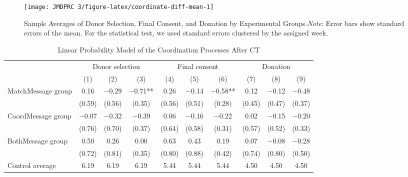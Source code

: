 \documentclass[12pt, a4paper]{article}
\begin{document}
\begin{table}[H]
\begin{threeparttable}
\begin{tablenotes}
\end{tablenotes}
\end{threeparttable}
\end{table}

\begin{figure}[H]
\texttt{[image: JMDPRC~3/figure-latex/coordinate-diff-mean-1]} \caption{Sample Averages of Donor Selection, Final Consent, and Donation by Experimental Groups.\newline \emph{Note}: Error bars show standard errors of the mean. For the statistical test, we used standard errors clustered by the assigned week.}\label{fig:coordinate-diff-mean}
\end{figure}

\begin{table}[H]

\caption{\label{tab:lm-coordinate}Linear Probability Model of the Coordination Processes After CT}
\centering
\fontsize{8}{10}\selectfont
\begin{threeparttable}
\begin{tabular}[t]{lccccccccc}
\toprule
\multicolumn{1}{c}{ } & \multicolumn{3}{c}{Donor selection} & \multicolumn{3}{c}{Final consent} & \multicolumn{3}{c}{Donation} \\
\cmidrule(l{3pt}r{3pt}){2-4} \cmidrule(l{3pt}r{3pt}){5-7} \cmidrule(l{3pt}r{3pt}){8-10}
  & (1) & (2) & (3) & (4) & (5) & (6) & (7) & (8) & (9)\\
\midrule
MatchMessage group & \num{0.16} & \num{-0.29} & \num{-0.71}** & \num{0.26} & \num{-0.14} & \num{-0.58}** & \num{0.12} & \num{-0.12} & \num{-0.48}\\
 & (\num{0.59}) & (\num{0.56}) & (\num{0.35}) & (\num{0.56}) & (\num{0.51}) & (\num{0.28}) & (\num{0.45}) & (\num{0.47}) & (\num{0.37})\\
CoordMessage group & \num{-0.07} & \num{-0.32} & \num{-0.39} & \num{0.06} & \num{-0.16} & \num{-0.22} & \num{0.02} & \num{-0.15} & \num{-0.20}\\
 & (\num{0.76}) & (\num{0.70}) & (\num{0.37}) & (\num{0.64}) & (\num{0.58}) & (\num{0.31}) & (\num{0.57}) & (\num{0.52}) & (\num{0.33})\\
BothMessage group & \num{0.50} & \num{0.26} & \num{0.00} & \num{0.63} & \num{0.43} & \num{0.19} & \num{0.07} & \num{-0.08} & \num{-0.28}\\
 & (\num{0.72}) & (\num{0.81}) & (\num{0.35}) & (\num{0.80}) & (\num{0.88}) & (\num{0.42}) & (\num{0.74}) & (\num{0.80}) & (\num{0.50})\\
\midrule
Control average & 6.19 & 6.19 & 6.19 & 5.44 & 5.44 & 5.44 & 4.50 & 4.50 & 4.50\\

\end{tabular}
\end{threeparttable}
\end{table}
\end{document}
